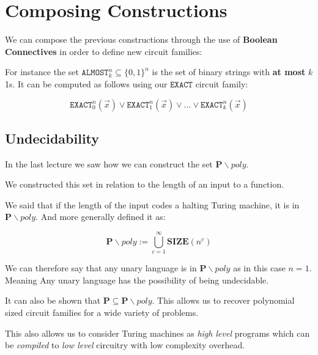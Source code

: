 \documentclass{article}
\begin{document}
    \section{Composing Constructions}


    We can compose the previous constructions through the use of \textbf{Boolean Connectives} in order to define new circuit families:

    For instance the set $\texttt{ALMOST}_{k}^{n} \subseteq \{ 0,1 \}^{n} $ is the set of binary strings with \textbf{at most} $k$ 1s. It can be computed as follows using our $\texttt{EXACT} $ circuit family:

    \[
      \texttt{EXACT}_{0}^{n}(\vec{x}) \vee \texttt{EXACT}_{1}^{n}(\vec{x})  \vee \ldots \vee \texttt{EXACT}_{k}^{n}(\vec{x})
    \]

    \subsection{Undecidability}

    In the last lecture we saw how we can construct the set $\mathbf{P} \backslash poly$.

    We constructed this set in relation to the length of an input to a function.

    We said that if the length of the input codes a halting Turing machine, it is in $\mathbf{P}\backslash poly $. And more generally defined it as:

\[
  \mathbf{P} \backslash poly := \bigcup_{c=1}^{\infty} \mathbf{SIZE}(n^{c})
\]

We can therefore say that any unary language is in $\mathbf{P}\backslash poly$ as in this case $n=1$. Meaning Any unary language has the possibility of being undecidable.


It can also be shown that $\mathbf{P} \subseteq \mathbf{P}\backslash poly  $. This allows us to recover polynomial sized circuit families for a wide variety of problems.

This also allows us to consider Turing machines as \textit{high level} programs which can be \textit{compiled} to \textit{low level} circuitry with low complexity overhead.
\end{document}

